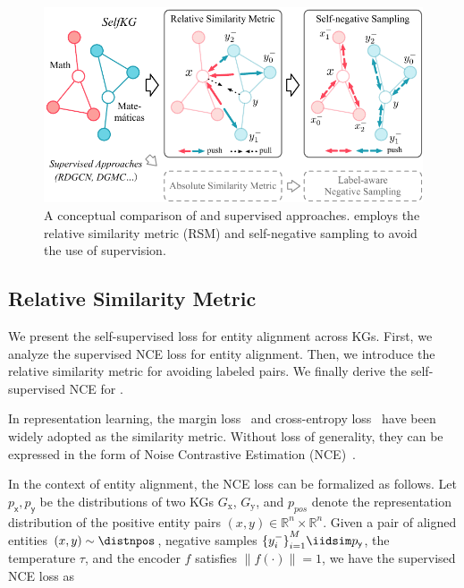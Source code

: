 \begin{figure}[t]
\centering
\includegraphics[width=\linewidth]{img/selfkg-new.pdf}
\caption{A conceptual comparison of \solution and supervised approaches. \textmd{\solution employs the relative similarity metric (RSM) and self-negative sampling to avoid the use of supervision.}
\label{fig:motivations}
}
% 
\vspace{-3mm}
\end{figure}



 
\subsection{Relative Similarity Metric}
\label{sec:rsm}

We present the self-supervised loss for entity alignment across KGs. 
First, we analyze the supervised NCE loss for entity alignment. 
Then, we introduce the relative similarity metric for avoiding labeled  pairs. 
We finally derive the self-supervised NCE for \solution. 

In representation learning, the margin loss~\cite{bordes2013translating,tang2019bert-int} and cross-entropy loss~\cite{zhang2019oag} have been widely adopted as the similarity metric. 
Without loss of generality, they can be expressed in the form of Noise Contrastive Estimation (NCE)~\cite{gutmann2010noise}. 

In the context of entity alignment, the NCE loss can be formalized as follows. 
Let $p_{\mathsf x}, p_{\mathsf y}$ be the distributions of two KGs $G_\mathrm{x}$, $G_\mathrm{y}$, and $p_{pos}$ denote the representation distribution of the positive entity pairs $(x,y)\in\mathbb{R}^n\times\mathbb{R}^n$.
Given a pair of aligned entities $(x, y) \sim \distnpos$, negative samples ${\{y^-_i\}}_{i=1}^M \iidsim p_{\mathsf y}$, the temperature $\tau$, and the encoder $f$ satisfies $\|f(\cdot)\|=1$, we have the supervised NCE loss as  

